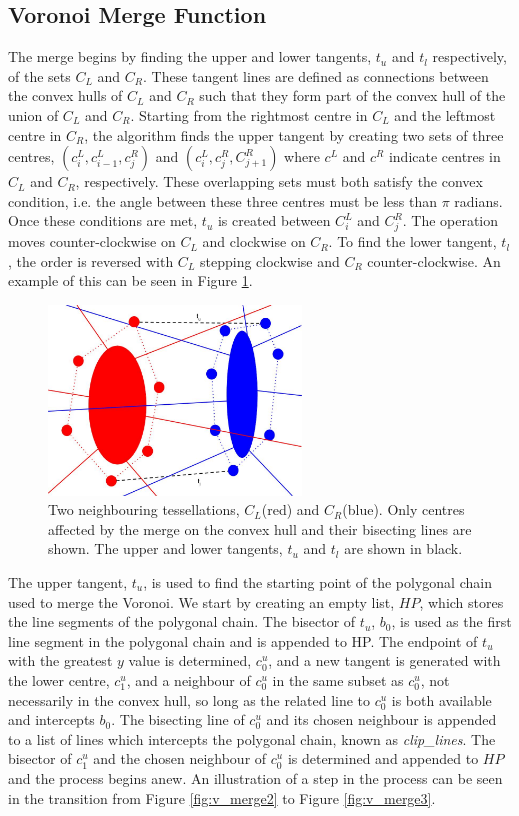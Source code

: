 \subsection{Voronoi Merge Function}
The merge begins by finding the upper and lower tangents, $t_u$ and $t_l$ respectively, of the sets $C_L$ and $C_R$. These tangent lines are defined as connections between the convex hulls of $C_L$ and $C_R$ such that they form part of the convex hull of the union of $C_L$ and $C_R$. Starting from the rightmost centre in $C_L$ and the leftmost centre in $C_R$, the algorithm finds the upper tangent by creating two sets of three centres, $(c^L_i,c^L_{i-1},c^R_j)$ and $(c^L_i,c^R_j,C^R_{j+1})$ where $c^L$ and $c^R$ indicate centres in $C_L$ and $C_R$, respectively. These overlapping sets must both satisfy the convex condition, i.e. the angle between these three centres must be less than $\pi$ radians. Once these conditions are met, $t_u$ is created between $C^L_i$ and $C^R_j$. The operation moves counter-clockwise on $C_L$ and clockwise on $C_R$. To find the lower tangent, $t_l$, the order is reversed with $C_L$ stepping clockwise and $C_R$ counter-clockwise. An example of this can be seen in Figure \ref{fig:v_merge1}.
\begin{figure}[H]
\centering
\includegraphics[width=0.6\textwidth]{Images/v_merge1.jpg}
\caption{Two neighbouring tessellations, $C_L$(red) and $C_R$(blue). Only centres affected by the merge on the convex hull and their bisecting lines are shown. The upper and lower tangents, $t_u$ and $t_l$ are shown in black.}
\label{fig:v_merge1}
\end{figure}
The upper tangent, $t_u$, is used to find the starting point of the polygonal chain used to merge the Voronoi. We start by creating an empty list, $HP$, which stores the line segments of the polygonal chain. The bisector of $t_u$, $b_0$, is used as the first line segment in the polygonal chain and is appended to HP. The endpoint of $t_u$ with the greatest $y$ value is determined, $c^u_0$, and a new tangent is generated with the lower centre, $c^u_1$, and a neighbour of $c^u_0$ in the same subset as $c^u_0$, not necessarily in the convex hull, so long as the related line to $c^u_0$ is both available and intercepts $b_0$. The bisecting line of $c^u_0$ and its chosen neighbour is appended to a list of lines which intercepts the polygonal chain, known as \textit{clip\_lines}. The bisector of $c^u_1$ and the chosen neighbour of $c^u_0$ is determined and appended to $HP$ and the process begins anew. An illustration of a step in the process can be seen in the transition from Figure \ref{fig:v_merge2} to Figure \ref{fig:v_merge3}.
